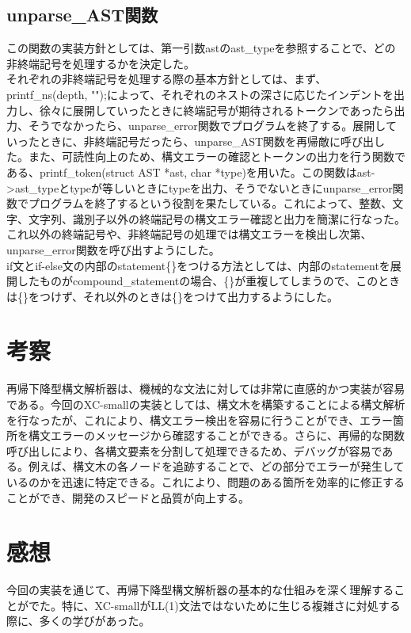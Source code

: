 \documentclass[a4paper,11pt]{jsarticle}
\begin{document}
\subsection{unparse\_AST関数}
この関数の実装方針としては、第一引数astのast\_typeを参照することで、どの非終端記号を処理するかを決定した。\\
\indent
それぞれの非終端記号を処理する際の基本方針としては、まず、printf\_ns(depth, "");によって、それぞれのネストの深さに応じたインデントを出力し、徐々に展開していったときに終端記号が期待されるトークンであったら出力、そうでなかったら、unparse\_error関数でプログラムを終了する。展開していったときに、非終端記号だったら、unparse\_AST関数を再帰敵に呼び出した。また、可読性向上のため、構文エラーの確認とトークンの出力を行う関数である、printf\_token(struct AST *ast, char *type)を用いた。この関数はast->ast\_typeとtypeが等しいときにtypeを出力、そうでないときにunparse\_error関数でプログラムを終了するという役割を果たしている。これによって、整数、文字、文字列、識別子以外の終端記号の構文エラー確認と出力を簡潔に行なった。これ以外の終端記号や、非終端記号の処理では構文エラーを検出し次第、unparse\_error関数を呼び出すようにした。\\
\indent
if文とif-else文の内部のstatement\{\}をつける方法としては、内部のstatementを展開したものがcompound\_statementの場合、\{\}が重複してしまうので、このときは\{\}をつけず、それ以外のときは\{\}をつけて出力するようにした。
\section{考察}
再帰下降型構文解析器は、機械的な文法に対しては非常に直感的かつ実装が容易である。今回のXC-smallの実装としては、構文木を構築することによる構文解析を行なったが、これにより、構文エラー検出を容易に行うことができ、エラー箇所を構文エラーのメッセージから確認することができる。さらに、再帰的な関数呼び出しにより、各構文要素を分割して処理できるため、デバッグが容易である。例えば、構文木の各ノードを追跡することで、どの部分でエラーが発生しているのかを迅速に特定できる。これにより、問題のある箇所を効率的に修正することができ、開発のスピードと品質が向上する。
\section{感想}
今回の実装を通じて、再帰下降型構文解析器の基本的な仕組みを深く理解することがでた。特に、XC-smallがLL(1)文法ではないために生じる複雑さに対処する際に、多くの学びがあった。
\end{document}
